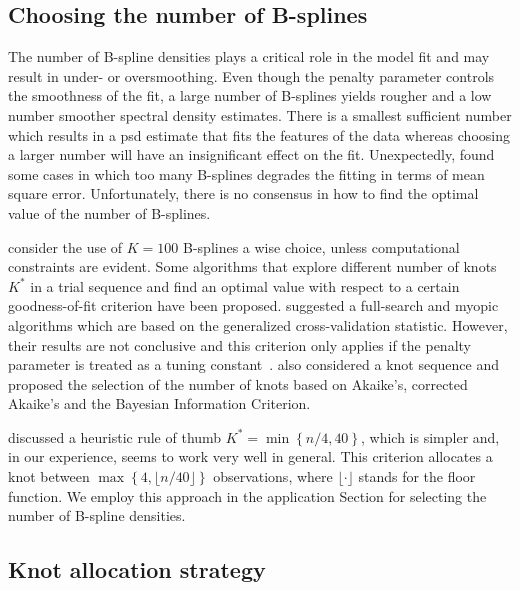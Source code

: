 \documentclass[twocolumn,final]{svjour3}
\begin{document}
\subsection*{Choosing the number of B-splines}

The number of B-spline densities plays a critical role in the model fit and may result in under- or oversmoothing.
Even though the penalty parameter controls the smoothness of the fit, a large number of B-splines yields rougher and  a low number  smoother spectral density estimates.  There is a smallest sufficient number which results in a psd estimate that fits the features of the data whereas choosing a larger number will have an insignificant effect on the fit.   Unexpectedly, \cite{Ruppert2002} found some cases in which too many B-splines degrades the fitting in terms of mean square error.  Unfortunately, there is no  consensus in how to find the optimal value of the number of B-splines.  

\cite{Eilers2015} consider the use of $K=100$ B-splines a wise choice, unless computational constraints are evident.  Some algorithms that explore different number of knots $K^*$ in a trial sequence and find an optimal value with respect to a certain goodness-of-fit criterion have been proposed. \cite{Ruppert2002} suggested a full-search and myopic algorithms which are based on the generalized cross-validation statistic.  However, their results are not conclusive and this criterion only applies if the penalty parameter is treated as a tuning constant~\citep{Kauermann2011}.  \cite{Likhachev2017} also considered a knot sequence and proposed the selection of the number of knots based on  Akaike's, corrected Akaike's and
the Bayesian Information Criterion.

\cite{Ruppert2002} discussed a heuristic rule of thumb $K^* = \min\left\{n/4, 40\right\}$, which is simpler and, in our experience, seems to work very well in general.  This criterion allocates a knot between $\max\left\{ 4, \lfloor n/40 \rfloor \right\}$ observations, where $\lfloor \cdot \rfloor$ stands for the floor function.  We employ this approach in the application Section for selecting the number of B-spline densities.


\subsection*{Knot allocation strategy}
\end{document}
